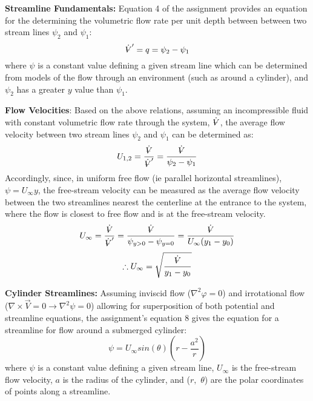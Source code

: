 \documentclass[12pt]{article}
\makeatletter
\DeclareRobustCommand{\volume}{\text{\volumedash}V}
\newcommand{\volumedash}{%
	\makebox[0pt][l]{%
		\ooalign{\hfil\hphantom{$\m@th V$}\hfil\cr\kern0.08em--\hfil\cr}%
	}%
}
\makeatother
\begin{document}
	\hfill\break\break
	\textbf{Streamline Fundamentals:}
	Equation 4 of the assignment provides an equation for the determining the volumetric flow rate per unit depth between between two stream lines $\psi_{2}$ and $\psi_{1}$:
	$$\dot{\volume}'=q=\psi_{2}-\psi_{1}$$
	where $\psi$ is a constant value defining a given stream line which can be determined from models of the flow through an environment (such as around a cylinder), and $\psi_{2}$ has a greater $y$ value than $\psi_{1}$.
	
	\hfill\break\break
	\textbf{Flow Velocities}:
	Based on the above relations, assuming an incompressible fluid with constant volumetric flow rate through the system, $\dot{\volume}$, the average flow velocity between two stream lines $\psi_{2}$ and $\psi_{1}$ can be determined as:
	$$U_{1,2}= \frac{\dot{\volume}}{\dot{\volume}'}=\frac{\dot{\volume}}{\psi_{2}-\psi_{1}}$$
	\hfill\break\break
	Accordingly, since, in uniform free flow (ie parallel horizontal streamlines), $\psi=U_{\infty}y$, the free-stream velocity can be measured as the average flow velocity between the two streamlines nearest the centerline at the entrance to the system, where the flow is closest to free flow and is at the free-stream velocity.
	$$U_{\infty}= \frac{\dot{\volume}}{\dot{\volume}'}=\frac{\dot{\volume}}{\psi_{y>0}-\psi_{y=0}}=\frac{\dot{\volume}}{U_{\infty}(y_{1}-y_{0})}$$
	$$\therefore U_{\infty}=\sqrt{\frac{\dot{\volume}}{y_{1}-y_{0}}}$$
	
	\hfill\break\break
	\textbf{Cylinder Streamlines:}
	Assuming inviscid flow ($\nabla^{2}\varphi=0$) and irrotational flow ($\nabla\times\vec{V}=0 \rightarrow \nabla^{2}\psi=0$) allowing for superposition of both potential and streamline equations, the assignment's equation 8 gives the equation for a streamline for flow around a submerged cylinder:
	$$ \psi = U_{\infty}sin(\theta)\left(r-\frac{a^{2}}{r}\right)$$
	where $\psi$ is a constant value defining a given stream line, $U_{\infty}$ is the free-stream flow velocity, $a$ is the radius of the cylinder, and ($r,$ $\theta$) are the polar coordinates of points along a streamline.
	
\end{document}
